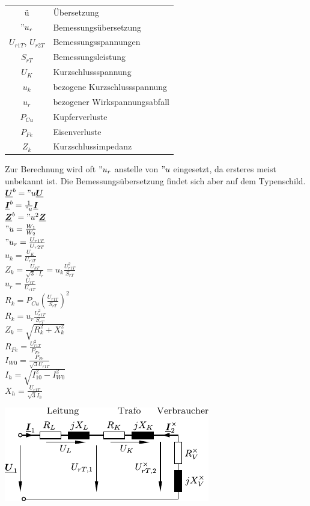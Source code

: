 \documentclass[fs, footer]{latex4ei}
\begin{document}
\begin{multicols}{4}
		\begin{tabular}{cl}
		ü & Übersetzung \\
		$"u_r$ & Bemessungsübersetzung \\
		$U_{r1T}$, $U_{r2T}$ & Bemessungsspannungen \\
		$S_{rT}$ & Bemessungsleistung \\
		$U_{K}$ & Kurzschlussspannung \\
		$u_k$ & bezogene Kurzschlussspannung \\
		$u_r$ & bezogener Wirkspannungsabfall \\
		$P_{Cu}$ & Kupferverluste \\
		$P_{Fe}$ & Eisenverluste \\
		$Z_k$ & Kurzschlussimpedanz
		\end{tabular}

		Zur Berechnung wird oft $"u_r$ anstelle von $"u$ eingesetzt, da ersteres meist unbekannt ist. Die Bemessungsübersetzung findet sich aber auf dem Typenschild. \\
		$\vec U^b = "u \vec U$ \\
		$\vec I^b = \frac{1}{"u} \vec I$ \\
		$\vec Z^b = "u^2 \vec Z$ \\
		$"u = \frac{W_1}{W_2}$ \\
		$"u_r = \frac{U_{r1T}}{U_{r2T}}$ \\
		$u_k = \frac{U_{K}}{U_{r1T}}$ \\
		$Z_k = \frac{U_{kT}}{\sqrt{3}\cdot I_r} = u_k \frac{U_{r1T}^2}{S_{rT}}$ \\
		$u_r = \frac{U_{rT}}{U_{r1T}}$ \\
		$R_k = P_{Cu} \left( \frac{U_{r1T}}{S_{rT}} \right)^2$ \\
		$R_k = u_r \frac{U_{r1T}^2}{S_{rT}}$ \\
		$Z_k = \sqrt{R_k^2 + X_k^2}$ \\
		$R_{Fe} = \frac{U_{r1T}^2}{P_{Fe}}$ \\
		$I_{W0} = \frac{P_{Fe}}{\sqrt{3} U_{r1T}}$ \\
		$I_h = \sqrt{I_{10}^2 - I_{W0}^2}$ \\
		$X_h = \frac{U_{r1T}}{\sqrt{3} I_h}$
	
	
		\includegraphics{./img/LeitungTrafo.pdf}
	

\end{multicols}
\end{document}
